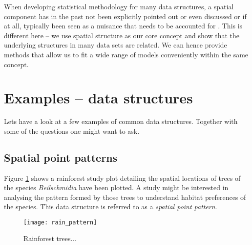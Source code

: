 When developing statistical methodology for many data structures, a spatial component has in the past not been explicitly pointed out or even discussed or if at all, typically been seen as a nuisance that needs to be accounted for . 
This is different here --  we use spatial structure as our core concept and show that the underlying structures in many data sets are related. We can hence provide methods that allow us to fit a wide range of models conveniently within the same concept.


\section{Examples -- data structures}

Lets have a look at a few examples of common data structures. Together with some of the questions one might want to ask.

\subsection{Spatial point patterns}\label{subs:spp}
Figure \ref{fig:rainpattern} shows  a rainforest study plot 
detailing the spatial locations of trees of the species \textit{Beilschmidia} have been plotted. A study might be interested in analysing the pattern formed by those trees to understand habitat preferences of the species.  This data structure is referred to as a \textit{spatial point pattern}.
\begin{figure}
\centering
\texttt{[image: rain\_pattern]}
\caption{\label{fig:rainpattern} Rainforest trees...}
\end{figure}

